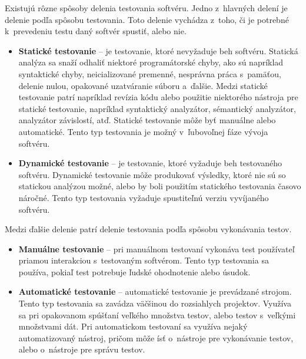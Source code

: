 Existujú rôzne spôsoby delenia testovania softvéru. 
Jedno z~hlavných delení je delenie podľa spôsobu testovania.
Toto delenie vychádza z~toho, či je potrebné k~prevedeniu 
testu daný softvér spustiť, alebo nie.
\begin{itemize}
\item \textbf{Statické testovanie} --
je testovanie, ktoré nevyžaduje beh softvéru. 
Statická analýza sa snaží odhaliť niektoré programátorské chyby, 
ako sú napríklad syntaktické chyby, neicializované premenné, 
nesprávna práca s~pamäťou, delenie nulou, opakované uzatváranie súboru 
a~ďalšie. 
Medzi statické testovanie patrí napríklad revízia kódu alebo použitie 
niektorého nástroja pre statické testovanie, napríklad 
syntaktický analyzátor, sémantický analyzátor, analyzátor závislostí, atď. 
Statické testovanie môže byť manuálne alebo automatické. 
Tento typ testovania je možný v~ľubovoľnej fáze vývoja softvéru.

\item \textbf{Dynamické testovanie} -- 
je testovanie, ktoré vyžaduje beh testovaného softvéru. 
Dynamické testovanie môže produkovať výsledky, ktoré nie sú so statickou 
analýzou možné, alebo by boli použitím statického testovania časovo náročné. 
Tento typ testovania vyžaduje spustiteľnú verziu vyvíjaného softvéru.
\end{itemize}


\noindent Medzi ďalšie delenie patrí delenie testovania podľa spôsobu 
vykonávania testov.
\begin{itemize}
\item \textbf{Manuálne testovanie} --
pri manuálnom testovaní vykonáva test používateľ priamou interakciou 
s~testovaným softvérom. Tento typ testovania sa používa, pokiaľ test 
potrebuje ľudské ohodnotenie alebo úsudok.

\item \textbf{Automatické testovanie} --
automatické testovanie je prevádzané strojom.
Tento typ testovania sa zavádza väčšinou do rozsiahlych projektov.
Využíva sa pri opakovanom spúšťaní veľkého množstva testov, alebo testov
s~veľkými množstvami dát. Pri automatickom testovaní sa využíva nejaký 
automatizovaný nástroj, pričom môže ísť o~nástroje 
pre vykonávanie testov, alebo o~nástroje pre správu testov.
\end{itemize}


